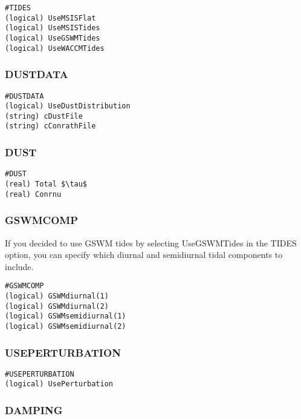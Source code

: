 \begin{verbatim}
#TIDES
(logical) UseMSISFlat      
(logical) UseMSISTides      
(logical) UseGSWMTides     
(logical) UseWACCMTides    
\end{verbatim}

\subsubsection{DUSTDATA}
\label{dustdata.sec}

\begin{verbatim}
#DUSTDATA
(logical) UseDustDistribution      
(string) cDustFile      
(string) cConrathFile  
\end{verbatim}

\subsubsection{DUST}
\label{dust.sec}

\begin{verbatim}
#DUST
(real) Total $\tau$      
(real) Conrnu
\end{verbatim}

\subsubsection{GSWMCOMP}
\label{gswmcomp.sec}

If you decided to use GSWM tides by selecting UseGSWMTides in the TIDES option, you can specify which diurnal and semidiurnal tidal components to include.

\begin{verbatim}
#GSWMCOMP
(logical) GSWMdiurnal(1)        
(logical) GSWMdiurnal(2)       
(logical) GSWMsemidiurnal(1)    
(logical) GSWMsemidiurnal(2)    
\end{verbatim}

\subsubsection{USEPERTURBATION}
\label{useperturbation.sec}

\begin{verbatim}
#USEPERTURBATION
(logical) UsePerturbation
\end{verbatim}

\subsubsection{DAMPING}
\label{damping.sec}

